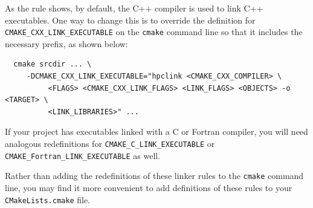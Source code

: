 \documentclass[11pt,letterpaper]{report}
\begin{document}
\noindent 
As the rule shows, by default, the C++ compiler is used to link C++ executables. One way to change this is to override the definition for \verb|CMAKE_CXX_LINK_EXECUTABLE|  on the {\tt cmake} command line so that it includes the  necessary \hpclink{} prefix, as shown below:

\begin{verbatim}
  cmake srcdir ... \
     -DCMAKE_CXX_LINK_EXECUTABLE="hpclink <CMAKE_CXX_COMPILER> \
          <FLAGS> <CMAKE_CXX_LINK_FLAGS> <LINK_FLAGS> <OBJECTS> -o <TARGET> \
          <LINK_LIBRARIES>" ...
\end{verbatim}

\noindent
If your project has executables linked with a C or Fortran compiler, you will need analogous redefinitions for \verb|CMAKE_C_LINK_EXECUTABLE| or  \verb|CMAKE_Fortran_LINK_EXECUTABLE| as well.

Rather than adding the redefinitions of these linker rules to the {\tt cmake} command line, 
you may find it more convenient to add definitions of these rules to your {\tt CMakeLists.cmake} file.

\end{document}
